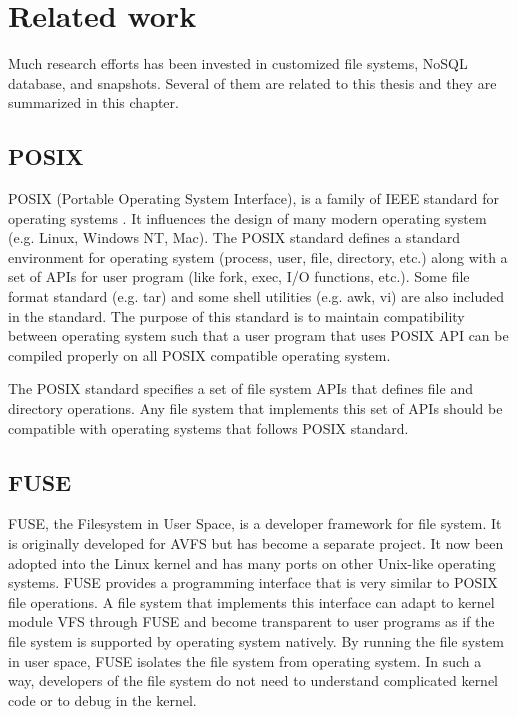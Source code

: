 \chapter{Related work}
\label{chap:related_work}

    Much research efforts has been invested in customized file systems, NoSQL database, and snapshots. Several of them are related to this thesis and they are summarized in this chapter.

\section{POSIX}

    POSIX (Portable Operating System Interface), is a family of IEEE standard for operating systems \cite{posix_wiki}. It influences the design of many modern operating system (e.g. Linux, Windows NT, Mac). The POSIX standard defines a standard environment for operating system (process, user, file, directory, etc.) along with a set of APIs for user program (like fork, exec, I/O functions, etc.)\cite{posix}. Some file format standard (e.g. tar) and some shell utilities (e.g. awk, vi) are also included in the standard. The purpose of this standard is to maintain compatibility between operating system such that a user program that uses POSIX API can be compiled properly on all POSIX compatible operating system.

    The POSIX standard specifies a set of file system APIs that defines file and directory operations. Any file system that implements this set of APIs should be compatible with operating systems that follows POSIX standard.

\section{FUSE}

    FUSE, the Filesystem in User Space, is a developer framework for file system. It is originally developed for AVFS but has become a separate project. It now been adopted into the Linux kernel and has many ports on other Unix-like operating systems. FUSE provides a programming interface that is very similar to POSIX file operations. A file system that implements this interface can adapt to kernel module VFS through FUSE and become transparent to user programs as if the file system is supported by operating system natively. By running the file system in user space, FUSE isolates the file system from operating system. In such a way, developers of the file system do not need to understand complicated kernel code or to debug in the kernel. \cite{fuse}

